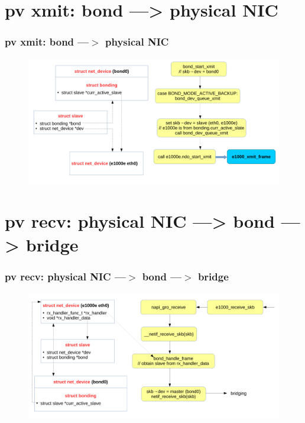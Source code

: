 \documentclass[aspectratio=169]{beamer}
\begin{document}
\section{pv xmit: bond ---> physical NIC}
\begin{frame}
\frametitle{pv xmit: bond ---$>$ physical NIC}
\begin{figure}
\includegraphics[width=1.0\linewidth]{figures/bridge_to_bond.pdf}
\end{figure}
\end{frame}


\section{pv recv: physical NIC ---> bond ---> bridge}
\begin{frame}
\frametitle{pv recv: physical NIC ---$>$ bond ---$>$ bridge}
\begin{figure}
\includegraphics[width=1.0\linewidth]{figures/bond_to_bridge.pdf}
\end{figure}
\end{frame}

\end{document}
